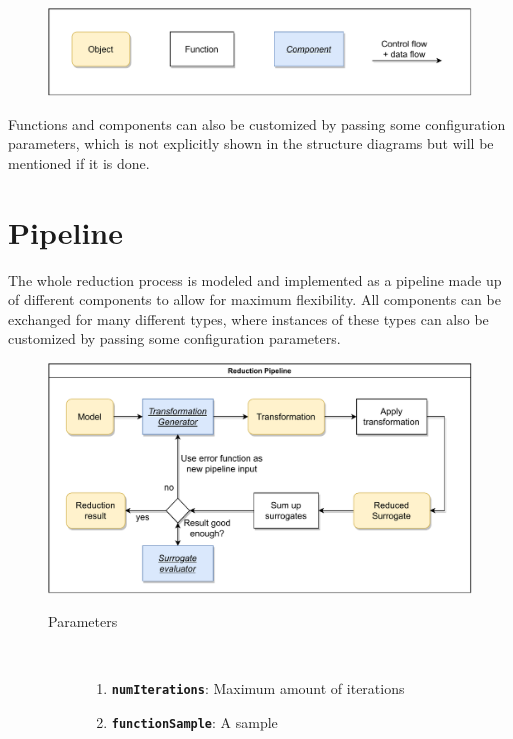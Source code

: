 \documentclass[
  a4paper,  %
  twoside,  %
  bibliography=totoc,
  headsepline,
  cleardoublepage=empty,
  parskip=half,
  draft=false
]{scrbook}
\begin{document}
\begin{figure}[H]
\includegraphics[width=\textwidth]{graphics/definitions.pdf}
\label{fig:defs}
\end{figure}

Functions and components can also be customized by passing some configuration parameters, which is not explicitly shown in the structure diagrams but will be mentioned if it is done.

\newpage
\section{Pipeline}

The whole reduction process is modeled and implemented as a pipeline made up of different components to allow for maximum flexibility.
All components can be exchanged for many different types, where instances of these types can also be customized by passing some configuration parameters.

\begin{figure}[H]

\includegraphics[width=\textwidth]{graphics/ReductionPipeline.pdf}
\vspace{-1.5mm}

\begin{mdframed}[linewidth=0.7px]

\begin{description}
\item[Parameters] {~ \begin{enumerate}[\indent{}]
\item \texttt{\textbf{numIterations}}: Maximum amount of iterations
\item \texttt{\textbf{functionSample}}: A sample
\end{enumerate}}
\end{description}

\end{mdframed}
\label{fig:astsg}
\end{figure}
\end{document}
